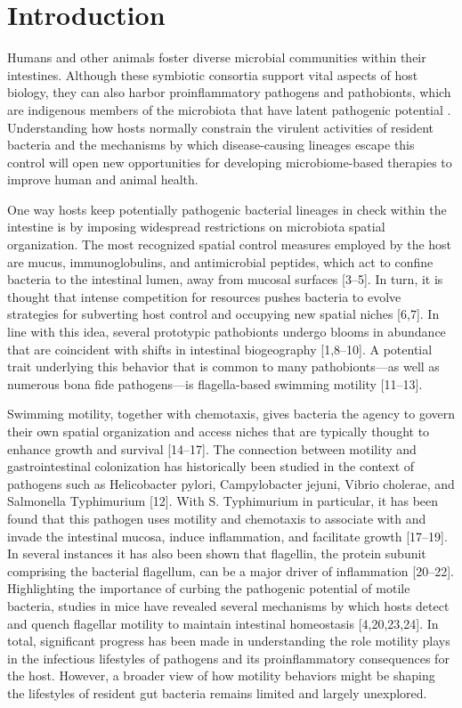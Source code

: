\section{Introduction}
Humans and other animals foster diverse microbial communities within their intestines. Although these symbiotic consortia support vital aspects of host biology, they can also harbor proinflammatory pathogens and pathobionts, which are indigenous members of the microbiota that have latent pathogenic potential \cite{Chow2011,Hajishengallis2016}. Understanding how hosts normally constrain the virulent activities of resident bacteria and the mechanisms by which disease-causing lineages escape this control will open new opportunities for developing microbiome-based therapies to improve human and animal health. 

One way hosts keep potentially pathogenic bacterial lineages in check within the intestine is by imposing widespread restrictions on microbiota spatial organization. The most recognized spatial control measures employed by the host are mucus, immunoglobulins, and antimicrobial peptides, which act to confine bacteria to the intestinal lumen, away from mucosal surfaces [3–5]. In turn, it is thought that intense competition for resources pushes bacteria to evolve strategies for subverting host control and occupying new spatial niches [6,7]. In line with this idea, several prototypic pathobionts undergo blooms in abundance that are coincident with shifts in intestinal biogeography [1,8–10]. A potential trait underlying this behavior that is common to many pathobionts—as well as numerous bona fide pathogens—is flagella-based swimming motility [11–13]. 

Swimming motility, together with chemotaxis, gives bacteria the agency to govern their own spatial organization and access niches that are typically thought to enhance growth and survival [14–17]. The connection between motility and gastrointestinal colonization has historically been studied in the context of pathogens such as Helicobacter pylori, Campylobacter jejuni, Vibrio cholerae, and Salmonella Typhimurium [12]. With S. Typhimurium in particular, it has been found that this pathogen uses motility and chemotaxis to associate with and invade the intestinal mucosa, induce inflammation, and facilitate growth [17–19]. In several instances it has also been shown that flagellin, the protein subunit comprising the bacterial flagellum, can be a major driver of inflammation [20–22]. Highlighting the importance of curbing the pathogenic potential of motile bacteria, studies in mice have revealed several mechanisms by which hosts detect and quench flagellar motility to maintain intestinal homeostasis [4,20,23,24]. In total, significant progress has been made in understanding the role motility plays in the infectious lifestyles of pathogens and its proinflammatory consequences for the host. However, a broader view of how motility behaviors might be shaping the lifestyles of resident gut bacteria remains limited and largely unexplored.

